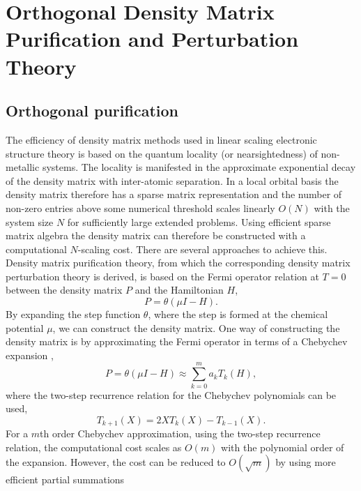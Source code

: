 \documentclass[twocolumn,showpacs,preprintnumbers,amsmath,amssymb]{revtex4}
\begin{document}
\section{Orthogonal Density Matrix Purification and Perturbation Theory}

\subsection{Orthogonal purification}

The efficiency of density matrix methods used in linear scaling electronic structure theory
is based on the quantum locality (or nearsightedness) of non-metallic systems. The locality is manifested in 
the approximate exponential decay of the density matrix with inter-atomic separation.  In a local orbital basis
the density matrix therefore has a sparse matrix representation and the number of non-zero entries
above some numerical threshold scales linearly $O(N)$ with the system size $N$ for sufficiently large 
extended problems.  Using efficient sparse matrix algebra the density matrix can 
therefore be constructed with a computational $N$-scaling cost. There are
several approaches to achieve this.  Density matrix purification theory, from which the
corresponding density matrix perturbation theory is derived, is based on the Fermi operator 
relation at $T=0$ between the density matrix $P$ and the Hamiltonian $H$,
\begin{equation}\label{DM}
P = \theta(\mu I -  H).
\end{equation}
By expanding the step function $\theta$, where the step is formed at the chemical potential $\mu$,
we can construct the density matrix. One way of constructing the density matrix is by approximating the Fermi operator
in terms of a Chebychev expansion \cite{Goedecker94,Silver94,Wang94,Baer97_JCP,Liang04},
\begin{equation}\label{Cheb}
P = \theta(\mu I -H) \approx \sum_{k=0}^m a_kT_k(H),
\end{equation}
where the two-step recurrence relation for the Chebychev polynomials can be used,
\begin{equation}
T_{k+1}(X) = 2XT_k(X)-T_{k-1}(X).
\end{equation}
For a $m$th order Chebychev approximation, using the two-step recurrence relation,
the computational cost scales as $O(m)$ with the polynomial order of the expansion. However, 
the cost can be reduced to $O({\sqrt m})$ by using more efficient partial summations
\end{document}
